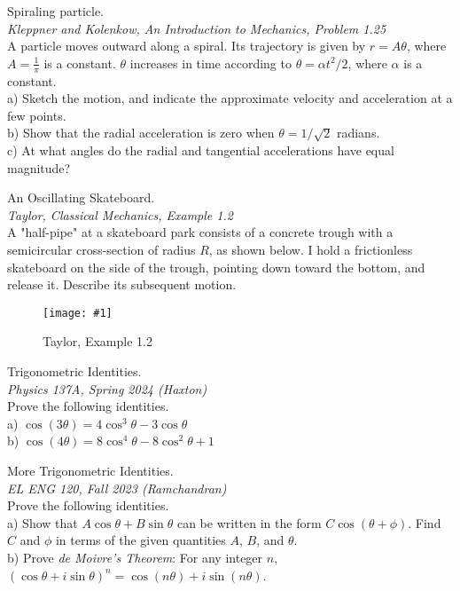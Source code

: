 \documentclass[11pt]{article}
\newcommand{\fig}[4]{
    \begin{figure}[H]
        \centering
        \texttt{[image: \#1]}
        \caption{#2}
        \label{exp4fit}
    \end{figure}
}
\theoremstyle{gangnamstyle}{\newtheorem{definition}{Definition}[]}
\theoremstyle{gangnamstyle}{\newtheorem{example}{Example}[]}
\theoremstyle{gangnamstyle}{\newtheorem{problem}{Problem}[]}
\begin{document}
\begin{problem}
Spiraling particle.  \\
\textit{Kleppner and Kolenkow, An Introduction to Mechanics, Problem 1.25} \\
A particle moves outward along a spiral. Its trajectory is given by $r = A\theta$, where $A = \frac{1}{\pi}$ is a constant. $\theta$ increases in time according to $\theta = \alpha t^2 / 2$, where $\alpha$ is a constant. \\ 

a) Sketch the motion, and indicate the approximate velocity and acceleration at a few points. \\
b) Show that the radial acceleration is zero when $\theta = 1 / \sqrt{2}$ radians.  \\
c) At what angles do the radial and tangential accelerations have equal magnitude? \\
\end{problem}

\begin{problem}
An Oscillating Skateboard. \\
\textit{Taylor, Classical Mechanics, Example 1.2} \\
A "half-pipe" at a skateboard park consists of a concrete trough with a semicircular cross-section of radius $R$, as shown below. I hold a frictionless skateboard on the side of the trough, pointing down toward the bottom, and release it. Describe its subsequent motion. 
\fig{figs/n0/taylor.jpg}{Taylor, Example 1.2}{0.4}{0}
\end{problem}

\begin{problem}
Trigonometric Identities. \\
\textit{Physics 137A, Spring 2024 (Haxton)} \\
Prove the following identities. \\ 

a) $\cos(3\theta) = 4\cos^3\theta - 3\cos\theta$ \\
b) $\cos(4\theta) = 8\cos^4\theta - 8\cos^2\theta + 1$ 
\end{problem}

\begin{problem}
More Trigonometric Identities. \\
\textit{EL ENG 120, Fall 2023 (Ramchandran)} \\
Prove the following identities. \\ 

a) Show that $A\cos\theta + B\sin\theta$ can be written in the form $C\cos(\theta + \phi)$. Find $C$ and $\phi$ in terms of the given quantities $A$, $B$, and $\theta$. \\
b) Prove \textit{de Moivre's Theorem}: For any integer $n$, $(\cos\theta + i\sin\theta)^n = \cos(n\theta) + i\sin(n\theta)$.  
\end{problem}
\end{document}
